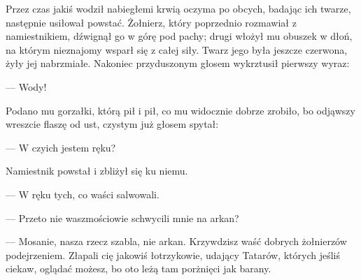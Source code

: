 Przez czas jakiś wodził nabiegłemi krwią oczyma po obcych, badając ich twarze, następnie usiłował powstać. Żołnierz, który poprzednio rozmawiał z namiestnikiem, dźwignął go w górę pod pachy; drugi włożył mu obuszek w dłoń, na którym nieznajomy wsparł się z całej siły. Twarz jego była jeszcze czerwona, żyły jej nabrzmiałe. Nakoniec przyduszonym głosem wykrztusił pierwszy wyraz:

— Wody!

Podano mu gorzałki, którą pił i pił, co mu widocznie dobrze zrobiło, bo odjąwszy wreszcie flaszę od ust, czystym już głosem spytał:

— W czyich jestem ręku?

Namiestnik powstał i zbliżył się ku niemu.

— W ręku tych, co waści salwowali.

— Przeto nie waszmościowie schwycili mnie na arkan?

— Mosanie, nasza rzecz szabla, nie arkan. Krzywdzisz waść dobrych żołnierzów podejrzeniem. Złapali cię jakowiś łotrzykowie, udający Tatarów, których jeśliś ciekaw, oglądać możesz, bo oto leżą tam porżnięci jak barany.
